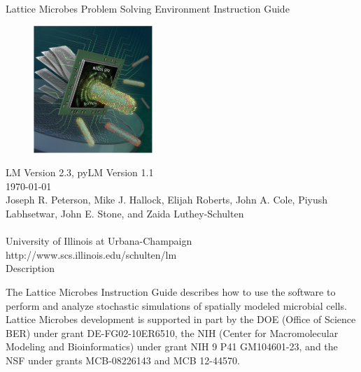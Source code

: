 \documentclass[12pt]{report}
\begin{document}
\newpage
\singlespacing
\normalsize
\setcounter{page}{1}
\renewcommand{\thepage}{\roman{page}}

\thispagestyle{empty}
\begin{center}{
\vspace*{0.6in}
{\huge Lattice Microbes Problem Solving Environment Instruction Guide}\\
\vspace*{0.2in}
\begin{figure}[h!]
  \centering
      \includegraphics[width=0.4\textwidth]{Figures/lm.pdf}
\end{figure}
\vspace*{0.15in}
{\large LM Version 2.3, pyLM Version 1.1}\\
{\large \today}\\
\vspace*{0.5in}
{\large Joseph R. Peterson, Mike J. Hallock, Elijah Roberts, John A. Cole, Piyush Labhsetwar, John E. Stone, and Zaida Luthey-Schulten}\\
~\\
{\large University of Illinois at Urbana-Champaign}\\
{\large http://www.scs.illinois.edu/schulten/lm}\\
\vspace*{0.4in}
{\Large Description}\\
}\end{center}

The Lattice Microbes Instruction Guide describes how to use the software to perform and analyze stochastic simulations of spatially modeled microbial cells. Lattice Microbes development is supported in part by the DOE (Office of Science BER) under grant DE-FG02-10ER6510, the NIH (Center for Macromolecular Modeling and Bioinformatics) under grant NIH 9 P41 GM104601-23, and the NSF under grants MCB-08226143 and MCB 12-44570.
\end{document}

